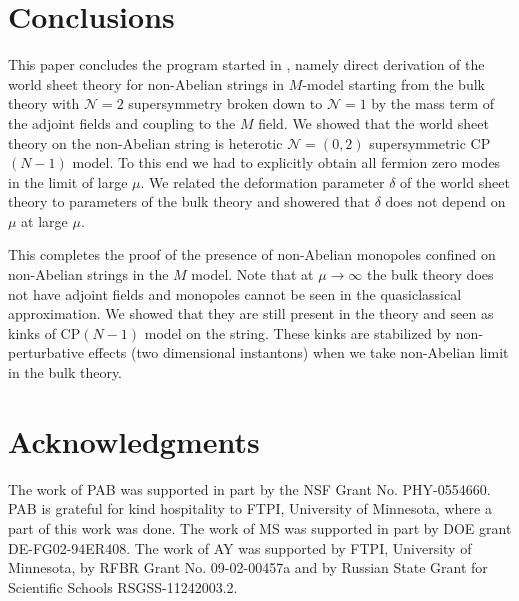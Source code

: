 \documentclass[12pt]{article}
\newcommand{\ntwo}{${\mathcal N}=2$ }
\newcommand{\ntwoo}{${\mathcal N}= \left(0,2\right) $ }
\newcommand{\none}{${\mathcal N}=1$ }
\begin{document}
\section{Conclusions}
\setcounter{equation}{0}

This paper concludes the program started in \cite{GSYmmodel},
namely direct derivation of the world sheet theory  for non-Abelian strings in $M$-model
starting from the bulk theory with \ntwo supersymmetry broken down to \none
by the mass term of the adjoint fields and coupling to the $M$ field.
We showed  that the world sheet
theory on the non-Abelian string is heterotic \ntwoo supersymmetric CP$(N-1)$ model.
To this end we had to explicitly obtain all fermion zero modes
 in the limit of  large $\mu $.
We related the  deformation parameter $\delta$ of the world sheet theory
to parameters of the bulk theory and showered that $\delta$
does not depend on $\mu$ at large $\mu$.

This completes the proof of the presence of non-Abelian monopoles confined on non-Abelian
strings in the $M$ model. Note that at  $\mu\to\infty$ the bulk theory does not have adjoint fields
and monopoles cannot be seen in the quasiclassical approximation. We showed that they are still
present in the theory and seen as  kinks of CP$(N-1)$ model on the string. These kinks
are stabilized by non-perturbative effects (two dimensional instantons) 
when we take non-Abelian limit in the bulk theory.







\section*{Acknowledgments}

The work of PAB was supported in part by the NSF Grant No. PHY-0554660. PAB is grateful for kind
hospitality to FTPI, University of Minnesota, where a part of this work was done. 
The work of MS was supported in part by DOE grant DE-FG02-94ER408. 
The work of AY was  supported 
by  FTPI, University of Minnesota, 
by RFBR Grant No. 09-02-00457a 
and by Russian State Grant for 
Scientific Schools RSGSS-11242003.2.
\end{document}
